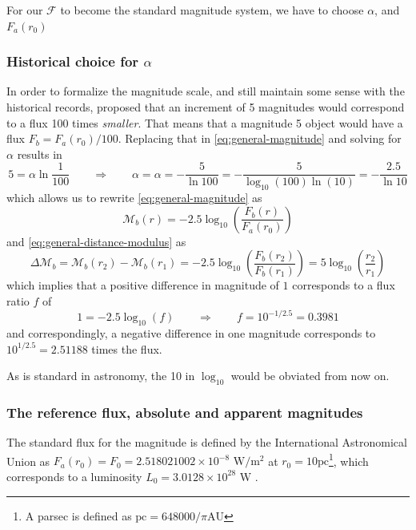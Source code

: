 	For our $\mathcal{F}$ to become the standard magnitude system, we have to choose $\alpha$, and $F_a(r_0)$
	
	\subsubsection{Historical choice for $\alpha$}
	
	In order to formalize the magnitude scale, and still maintain some sense with the historical records, 
	\cite{Pogson1856} proposed that an increment of 5 magnitudes would correspond to a flux 100 times \textit{smaller}. 
	That means that a magnitude 5 object would have a flux $F_b = F_a(r_0)/100$. 
	Replacing that in \autoref{eq:general-magnitude} and solving for $\alpha$ results in
	$$
		5 = \alpha \ln\frac{1}{100} \qquad \Rightarrow \qquad \alpha = \alpha = -\frac{5}{\ln 100} = -\frac{5}{\log_{10}(100)\ln(10)} = -\frac{2.5}{\ln 10}
	$$
	which allows us to rewrite \autoref{eq:general-magnitude} as 
	\begin{equation}
		\mathcal{M}_b(r) = -2.5 \log_{10}\left(\frac{F_b(r)}{F_a(r_0)}\right) \label{eq:magnitude}
	\end{equation}
	and \autoref{eq:general-distance-modulus} as
	\begin{equation}
		\Delta\mathcal{M}_b = \mathcal{M}_b(r_2) - \mathcal{M}_b(r_1) 
			= -2.5\log_{10}\left(\frac{F_b(r_2)}{F_b(r_1)}\right) 
			=  5 \log_{10}\left(\frac{r_2}{r_1}\right)
		\label{eq:magnitude-delta}
	\end{equation}
	which implies that a positive difference in magnitude of $1$ corresponds to a flux ratio $f$ of
	$$
		1 = -2.5 \log_{10}(f) \qquad \Rightarrow \qquad f = 10^{-1/2.5} = 0.3981
	$$
	and correspondingly, a negative difference in one magnitude corresponds to $10^{1/2.5}=2.51188$ times the flux.
	
	As is standard in astronomy, the 10 in $\log_10$ would be obviated from now on.
	
	\subsubsection{The reference flux, absolute and apparent magnitudes}
	
	The standard flux for the magnitude is defined by the International Astronomical Union as
	$F_a(r_0)=F_0= 2.518 021 002 \times 10^{-8}\text{ W}/\text{m}^2$ at $r_0=10\text{pc}$\;\footnote{A parsec is defined as $\text{pc}=648 000/\pi \text{AU}$}, 
	which corresponds to a luminosity $L_0=3.0128\times 10^{28} \text{ W}$ \citep[IAU, B2]{IAUB22015}. 
	
